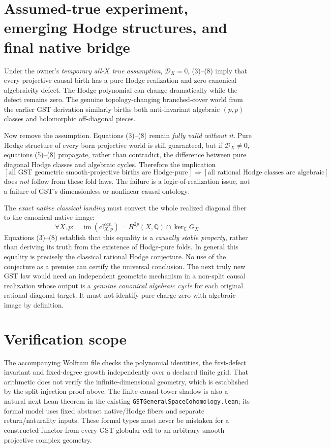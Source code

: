 \documentclass[11pt]{article}
\begin{document}
\section{Assumed-true experiment, emerging Hodge structures, and final native bridge}
Under the owner's \emph{temporary all-\(X\) true assumption},
\(\mathcal D_X=0\), (3)--(8) imply that every projective
causal birth has a pure Hodge realization and zero
canonical algebraicity defect. The Hodge polynomial can
change dramatically while the defect remains zero.
The genuine topology-changing branched-cover world
from the earlier GST derivation similarly births both
anti-invariant algebraic \((p,p)\) classes and holomorphic
off-diagonal pieces.

Now remove the assumption. Equations (3)--(8) remain
\emph{fully valid without it}. Pure Hodge structure of
every born projective world is still guaranteed, but
if \(\mathcal D_X\ne0\), equations (5)--(8) propagate,
rather than contradict, the difference between pure
diagonal Hodge classes and algebraic cycles.
Therefore the implication
\[
  [\text{all GST geometric smooth-projective births are Hodge-pure}]
   \Longrightarrow
  [\text{all rational Hodge classes are algebraic}]
                                                               \tag{9}
\]
does \emph{not} follow from these fold laws. The failure
is a logic-of-realization issue, not a failure of GST's
dimensionless or nonlinear causal ontology.

The \emph{exact native classical landing} must convert
the whole realized diagonal fiber to the canonical
native image:
\[
 \boxed{\forall X,p:\quad
       \operatorname{im}(\mathrm{cl}^{can}_{X,p})=
       H^{2p}(X,\mathbb Q)\cap \ker_{\mathbb C} G_X .}          \tag{10}
\]
Equations (3)--(8) establish that this equality is a
\emph{causally stable property}, rather than deriving
its truth from the existence of Hodge-pure folds.
In general this equality is precisely the classical
rational Hodge conjecture. No use of the conjecture as a
premise can certify the universal conclusion.
The next truly new GST law would need an independent
geometric mechanism in a non-split causal realization
whose output is a \emph{genuine canonical algebraic
cycle} for each original rational diagonal target.
It must not identify pure charge zero with algebraic
image by definition.

\section{Verification scope}
The accompanying Wolfram file checks the polynomial
identities, the first-defect invariant and fixed-degree
growth independently over a declared finite grid.
That arithmetic does not verify the infinite-dimensional
geometry, which is established by the split-injection
proof above. The finite-causal-tower shadow is also a
natural next Lean theorem in the existing
\texttt{GSTGeneralSpaceCohomology.lean}; its formal
model uses fixed abstract native/Hodge fibers and
separate return/naturality inputs. These formal types
must never be mistaken for a constructed functor from
every GST globular cell to an arbitrary smooth projective
complex geometry.
\end{document}
